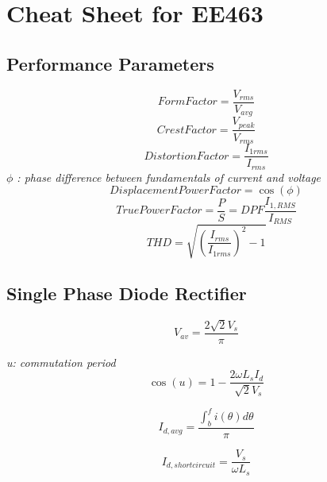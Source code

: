 \documentclass[twocolumn, ]{article}
\begin{document}
\section*{\small Cheat Sheet for EE463}

\subsection*{\small Performance Parameters}
\begin{equation*}
Form Factor=\frac{V_{rms}}{V_{avg}}
\end{equation*}
\begin{equation*}
Crest Factor=\frac{V_{peak}}{V_{rms}}
\end{equation*}
\begin{equation*}
Distortion Factor=\frac{I_{1rms}}{I_{rms}}
\end{equation*}
\textit{$\phi$ : phase difference between fundamentals of current and voltage}
\begin{equation*}
Displacement Power Factor=\cos(\phi)
\end{equation*}
\begin{equation*}
True Power Factor=\frac{P}{S}=DPF \frac{I_{1,RMS}}{I_{RMS}}
\end{equation*}
\begin{equation*}
THD=\sqrt{(\frac{I_{rms}}{I_{1rms}})^2-1}
\end{equation*}



\subsection*{\small Single Phase Diode Rectifier}

\begin{equation*}
	V_{av}=\dfrac{2 \sqrt{2}V_{s}} { \pi}
\end{equation*}

\textit {u: commutation period}
\begin{equation*}
 	\cos(u)=1-\dfrac{2\omega L_{s} I_{d}}{\sqrt[]{2}V_{s}}
\end{equation*}

\begin{equation*}
 	I_{d,avg}= \dfrac{\int_b^f i(\theta) d \theta}{\pi}
\end{equation*}

\begin{equation*}
 	I_{d,short circuit} = \dfrac{V_s}{\omega L_s}
\end{equation*}
\end{document}
